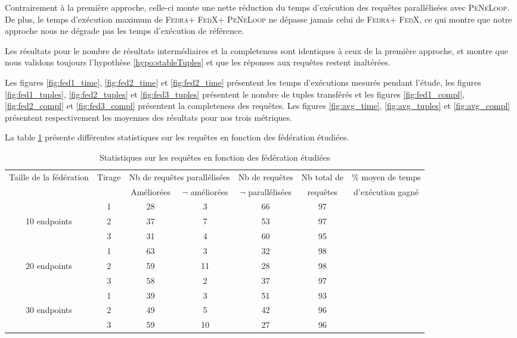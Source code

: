 \documentclass[a4paper]{article}
\def\fedra{\textsc{Fedra}\xspace}
\def\fedx{\textsc{FedX}\xspace}
\def\peneloop{\textsc{PeNeLoop}\xspace}
\begin{document}
Contrairement à la première approche, celle-ci monte une nette réduction du temps d'exécution des requêtes parallélisées avec \peneloop. De plus, le temps d'exécution maximum de \fedra + \fedx + \peneloop ne dépasse jamais celui de \fedra + \fedx, ce qui montre que notre approche nous ne dégrade pas les temps d'exécution de référence.

Les résultats pour le nombre de résultats intermédiaires et la completeness sont identiques à ceux de la première approche, et montre que nous validons toujours l'hypothèse \ref{hypo:stableTuples} et que les réponses aux requêtes restent inaltérées.

Les figures \ref{fig:fed1_time}, \ref{fig:fed2_time} et \ref{fig:fed2_time} présentent les temps d'exécutions mesurés pendant l'étude, les figures \ref{fig:fed1_tuples}, \ref{fig:fed2_tuples} et \ref{fig:fed3_tuples} présentent le nombre de tuples transférés et les figures \ref{fig:fed1_compl}, \ref{fig:fed2_compl} et \ref{fig:fed3_compl} présentent la completeness des requêtes. Les figures \ref{fig:avg_time}, \ref{fig:avg_tuples} et \ref{fig:avg_compl} présentent respectivement les moyennes des résultats pour nos trois métriques.

La table \ref{table:stats_pipeline} présente différentes statistiques sur les requêtes en fonction des fédération étudiées.

\begin{table}[h]
    \centering
    \begin{tabular}{|c|c|c|c|c|c|c|}
    \hline
    Taille de la fédération & Tirage & \multicolumn{2}{c|}{Nb de requêtes parallélisées} & Nb de requêtes & Nb total de & \% moyen de temps \\
    \cline{3-4}
     & & Améliorées & $\neg$ améliorées & $\neg$ parallélisées & requêtes & d'exécution gagné\\
    \hline
     & 1 & 28 & 3 & 66 & 97 & \\
    \cline{2-7}
    10 endpoints & 2 & 37 & 7 & 53 & 97 & \\
    \cline{2-7}
     & 3 & 31 & 4 & 60 & 95 & \\
    \hline
     & 1 & 63 & 3 & 32 & 98 & \\
    \cline{2-7}
    20 endpoints & 2 & 59 & 11 & 28 & 98 & \\
    \cline{2-7}
     & 3 & 58 & 2 & 37 & 97 & \\
    \hline
     & 1 & 39 & 3 & 51 & 93 & \\
    \cline{2-7}
    30 endpoints & 2 & 49 & 5 & 42 & 96 & \\
    \cline{2-7}
     & 3 & 59 & 10 & 27 & 96 & \\
    \hline
    \end{tabular}
    \caption{Statistiques sur les requêtes en fonction des fédération étudiées}
    \label{table:stats_pipeline}
\end{table}
\end{document}
